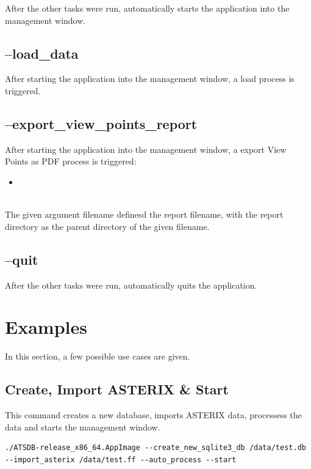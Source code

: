 After the other tasks were run, automatically starts the application into the management window.

\subsection{--load\_data}

After starting the application into the management window, a load process is triggered.


\subsection{--export\_view\_points\_report}

After starting the application into the management window, a export View Points as PDF process is triggered:

\begin{itemize}
 \item {}
\end{itemize}
\ \\

The given argument filename definesd the report filename, with the report directory as the parent directory of the given filename.


\subsection{--quit}

After the other tasks were run, automatically quits the application.

\section{Examples}

In this section, a few possible use cases are given.

\subsection{Create, Import ASTERIX \& Start}

This command creates a new database, imports ASTERIX data, processess the data and starts the management window.

\begin{lstlisting}
./ATSDB-release_x86_64.AppImage --create_new_sqlite3_db /data/test.db --import_asterix /data/test.ff --auto_process --start
\end{lstlisting}
\ \\

